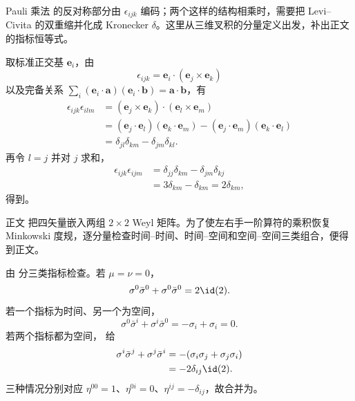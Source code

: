 

\begin{derivation}

Pauli 乘法 的反对称部分由 $\epsilon_{ijk}$ 编码；两个这样的结构相乘时，需要把 Levi--Civita 的双重缩并化成 Kronecker $\delta$。这里从三维叉积的分量定义出发，补出正文 的指标恒等式。



取标准正交基 $\mathbf e_i$，由
\begin{equation*}
 \epsilon_{ijk}=\mathbf e_i\cdot(\mathbf e_j\times\mathbf e_k)
\end{equation*}
以及完备关系 $\sum_i(\mathbf e_i\cdot\mathbf a)(\mathbf e_i\cdot\mathbf b)=\mathbf a\cdot\mathbf b$，有
\begin{align*}
 \epsilon_{ijk}\epsilon_{ilm}
 &= (\mathbf e_j\times\mathbf e_k)\cdot(\mathbf e_l\times\mathbf e_m)\\
 &= (\mathbf e_j\cdot\mathbf e_l)(\mathbf e_k\cdot\mathbf e_m)
 -(\mathbf e_j\cdot\mathbf e_m)(\mathbf e_k\cdot\mathbf e_l)\\
 &=\delta_{jl}\delta_{km}-\delta_{jm}\delta_{kl}.
\end{align*}
再令 $l=j$ 并对 $j$ 求和，
\begin{align*}
 \epsilon_{ijk}\epsilon_{ijm}
 &=\delta_{jj}\delta_{km}-\delta_{jm}\delta_{kj}\\
 &=3\delta_{km}-\delta_{km}=2\delta_{km},
\end{align*}
得到。
\end{derivation}

\begin{derivation}

正文 把四矢量嵌入两组 $2\times2$ Weyl 矩阵。为了使左右手一阶算符的乘积恢复 Minkowski 度规，逐分量检查时间--时间、时间--空间和空间--空间三类组合，便得到正文。



由 分三类指标检查。若 $\mu=\nu=0$，
\begin{equation*}
 \sigma^0\bar\sigma^0+\sigma^0\bar\sigma^0=2\id(2).
\end{equation*}
若一个指标为时间、另一个为空间，
\begin{equation*}
 \sigma^0\bar\sigma^i+\sigma^i\bar\sigma^0
 =-\sigma_i+\sigma_i=0.
\end{equation*}
若两个指标都为空间， 给
\begin{align*}
 \sigma^i\bar\sigma^j+\sigma^j\bar\sigma^i
 &=-(\sigma_i\sigma_j+\sigma_j\sigma_i)\\
 &=-2\delta_{ij}\id(2).
\end{align*}
三种情况分别对应 $\eta^{00}=1$、$\eta^{0i}=0$、$\eta^{ij}=-\delta_{ij}$，故合并为。
\end{derivation}
